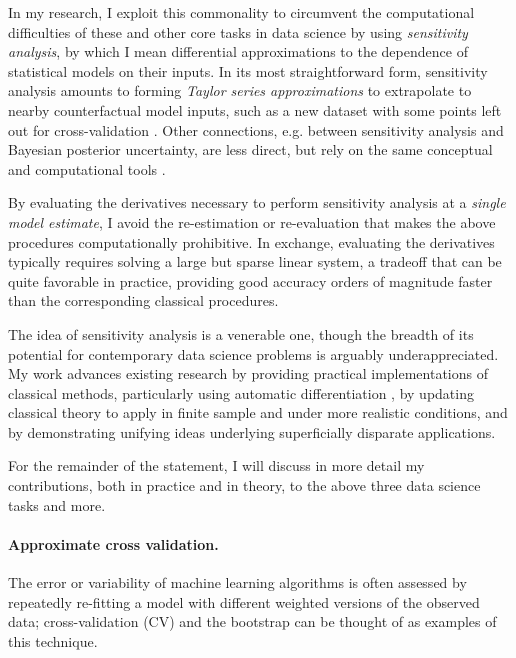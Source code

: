 In my research, I exploit this commonality to circumvent the computational
difficulties of these and other core tasks in data science by using {\em
sensitivity analysis}, by which I mean differential approximations to the
dependence of statistical models on their inputs.  In its most straightforward
form, sensitivity analysis amounts to forming {\em Taylor series approximations}
to extrapolate to nearby counterfactual model inputs, such as a new dataset with
some points left out for cross-validation \citep{giordano:2018:bnpsensitivity,
giordano:2019:ij}.  Other connections, e.g. between sensitivity analysis and
Bayesian posterior uncertainty, are less direct, but rely on the same conceptual
and computational tools \citep{giordano:2018:covariances}.

By evaluating the derivatives necessary to perform sensitivity analysis at a
{\em single model estimate}, I avoid the re-estimation or re-evaluation that
makes the above procedures computationally prohibitive.  In exchange, evaluating
the derivatives typically requires solving a large but sparse linear system, a
tradeoff that can be quite favorable in practice, providing good accuracy orders
of magnitude faster than the corresponding classical procedures.

The idea of sensitivity analysis is a venerable one, though the breadth of its
potential for contemporary data science problems is arguably underappreciated.
My work advances existing research by providing practical implementations of
classical methods, particularly using automatic differentiation
\citep{baydin:2015:automatic}, by updating classical theory to apply in finite
sample and under more realistic conditions, and by demonstrating unifying ideas
underlying superficially disparate applications.

For the remainder of the statement, I will discuss in more detail my
contributions, both in practice and in theory, to the above three data science
tasks and more.


\newpage

\paragraph{Approximate cross validation.}

The error or variability of machine learning algorithms is often assessed by
repeatedly re-fitting a model with different weighted versions of the observed
data; cross-validation (CV) and the bootstrap can be thought of as examples of
this technique.

